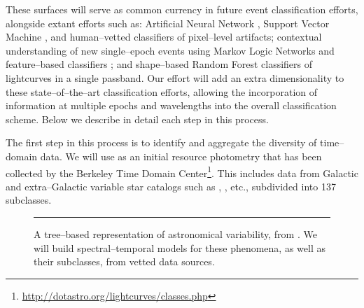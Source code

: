 These surfaces will serve as common currency in future event classification
efforts, alongside extant efforts such as: Artificial Neural Network
\citep{2008AN....329..263D}, Support Vector Machine \citep{2007ApJ...665.1246B},
and human--vetted \citep{2011arXiv1106.5491B} classifiers of pixel--level
artifacts; contextual understanding of new single--epoch events using Markov
Logic Networks \citep{2011arXiv1110.4655D} and feature--based classifiers
\citep{2011arXiv1106.5491B}; and shape--based Random Forest
\citep{2011ApJ...733...10R} classifiers of lightcurves in a single passband. Our
effort will add an extra dimensionality to these state--of--the--art
classification efforts, allowing the incorporation of information at multiple
epochs and wavelengths into the overall classification scheme.  Below we
describe in detail each step in this process.


 \smallskip

The first step in this process is to identify and aggregate the diversity of
time--domain data.  We will use as an initial resource photometry that has been
collected by the Berkeley Time Domain Center\footnote{\url{
http://dotastro.org/lightcurves/classes.php}}.  This includes data from Galactic
and extra--Galactic variable star catalogs such as \cite{2008yCat.2285....0B},
\cite{2001AJ....121..870M}, etc., subdivided into 137 subclasses.

\begin{figure}[t]
\centerline{} \smallskip
\caption[]{\footnotesize A tree--based representation of astronomical
variability, from \cite{2008JPhCS.118a2010E}.  We will build spectral--temporal
models for these phenomena, as well as their subclasses, from vetted data
sources.} \medskip \hrule \label{fig:var} \end{figure}

